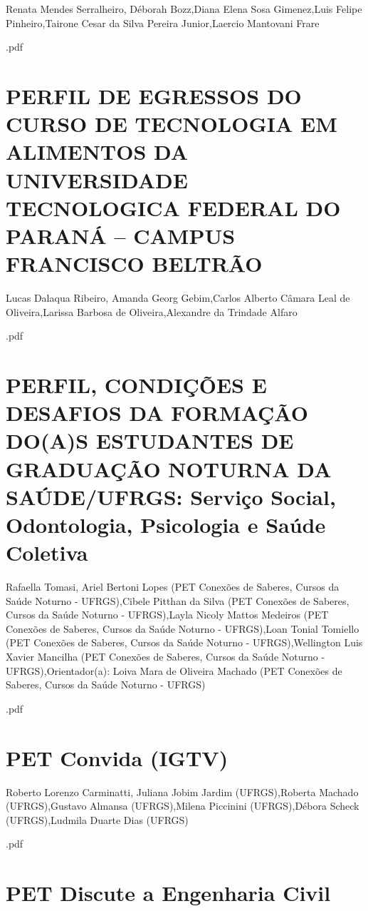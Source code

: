 Renata Mendes Serralheiro, Déborah Bozz,Diana Elena Sosa Gimenez,Luis Felipe Pinheiro,Tairone Cesar da Silva Pereira Junior,Laercio Mantovani Frare



.pdf\section{PERFIL DE EGRESSOS DO CURSO DE TECNOLOGIA EM ALIMENTOS DA UNIVERSIDADE TECNOLOGICA FEDERAL DO PARANÁ – CAMPUS FRANCISCO BELTRÃO}

Lucas Dalaqua Ribeiro, Amanda Georg Gebim,Carlos Alberto Câmara Leal de Oliveira,Larissa Barbosa de Oliveira,Alexandre da Trindade Alfaro



.pdf\section{PERFIL, CONDIÇÕES E DESAFIOS DA FORMAÇÃO DO(A)S ESTUDANTES DE GRADUAÇÃO NOTURNA DA SAÚDE/UFRGS:  Serviço Social, Odontologia, Psicologia e Saúde Coletiva}

Rafaella Tomasi, Ariel Bertoni Lopes (PET Conexões de Saberes, Cursos da Saúde Noturno - UFRGS),Cibele Pitthan da Silva (PET Conexões de Saberes, Cursos da Saúde Noturno - UFRGS),Layla Nicoly Mattos Medeiros (PET Conexões de Saberes, Cursos da Saúde Noturno - UFRGS),Loan Tonial Tomiello (PET Conexões de Saberes, Cursos da Saúde Noturno - UFRGS),Wellington Luis Xavier Mancilha (PET Conexões de Saberes, Cursos da Saúde Noturno - UFRGS),Orientador(a): Loiva Mara de Oliveira Machado (PET Conexões de Saberes, Cursos da Saúde Noturno - UFRGS)



.pdf\section{PET Convida (IGTV)}

Roberto Lorenzo Carminatti, Juliana Jobim Jardim (UFRGS),Roberta Machado (UFRGS),Gustavo Almansa (UFRGS),Milena Piccinini (UFRGS),Débora Scheck (UFRGS),Ludmila Duarte Dias (UFRGS)



.pdf\section{PET Discute a Engenharia Civil}

